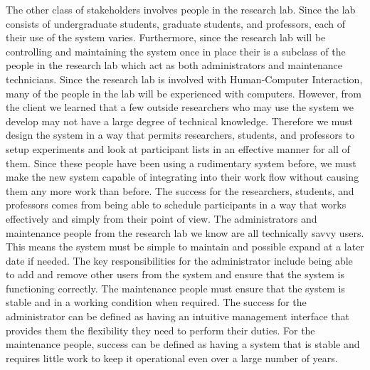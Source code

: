 \documentclass{article}
\begin{document}
The other class of stakeholders involves people in the research lab. Since the lab consists of undergraduate students, graduate students, and professors, each of their use of the system varies. Furthermore, since the research lab will be controlling and maintaining the system once in place their is a subclass of the people in the research lab which act as both administrators and maintenance technicians. Since the research lab is involved with Human-Computer Interaction, many of the people in the lab will be experienced with computers. However, from the client we learned that a few outside researchers who may use the system we develop may not have a large degree of technical knowledge. Therefore we must design the system in a way that permits researchers, students, and professors to setup experiments and look at participant lists in an effective manner for all of them. Since these people have been using a rudimentary system before, we must make the new system capable of integrating into their work flow without causing them any more work than before. The success for the researchers, students, and professors comes from being able to schedule participants in a way that works effectively and simply from their point of view. The administrators and maintenance people from the research lab we know are all technically savvy users. This means the system must be simple to maintain and possible expand at a later date if needed. The key responsibilities for the administrator include being able to add and remove other users from the system and ensure that the system is functioning correctly. The maintenance people must ensure that the system is stable and in a working condition when required. The success for the administrator can be defined as having an intuitive management interface that provides them the flexibility they need to perform their duties. For the maintenance people, success can be defined as having a system that is stable and requires little work to keep it operational even over a large number of years.
\end{document}
